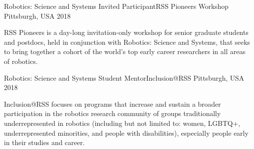 \begin{cventries}
  \cventry
    {Robotics: Science and Systems} %
    {Invited Participant{\awesomesep}RSS Pioneers Workshop} %
    {Pittsburgh, USA} %
    {2018} %
    {
      \begin{cvitems} %
        \item {RSS Pioneers is a day-long invitation-only workshop for senior graduate students and postdocs, held in conjunction with Robotics: Science and Systems, that seeks to bring together a cohort of the world’s top early career researchers in all areas of robotics.}
      \end{cvitems}
    }
    
  \cventry
    {Robotics: Science and Systems} %
    {Student Mentor{\awesomesep}Inclusion@RSS} %
    {Pittsburgh, USA} %
    {2018} %
    {
      \begin{cvitems} %
        \item {Inclusion@RSS focuses on programs that increase and sustain a broader participation in the robotics research community of groups traditionally underrepresented in robotics (including but not limited to: women, LGBTQ+, underrepresented minorities, and people with disabilities), especially people early in their studies and career.}
      \end{cvitems}
    }




\end{cventries}
